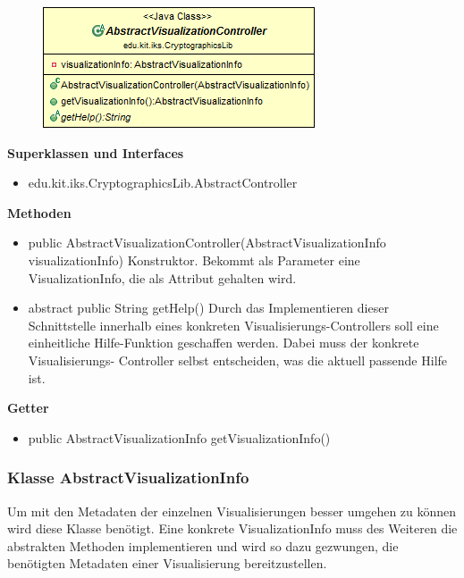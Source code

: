 \documentclass{article}
\begin{document}
      \begin{figure}[H]
        \centering
        \includegraphics{resources/edu-kit-iks-CryptographicsLib-AbstractVisualizationController}
      \end{figure}
	
      \textbf{Superklassen und Interfaces}
      \begin{itemize}
        \item edu.kit.iks.CryptographicsLib.AbstractController
      \end{itemize}
	
      \textbf{Methoden}
      \begin{itemize}
        \item public AbstractVisualizationController(AbstractVisualizationInfo visualizationInfo) \newline
          Konstruktor. Bekommt als Parameter eine VisualizationInfo, die als Attribut gehalten wird.
        \item abstract public String getHelp() \newline
          Durch das Implementieren dieser Schnittstelle innerhalb eines konkreten Visualisierungs-Controllers
          soll eine einheitliche Hilfe-Funktion geschaffen werden. Dabei muss der konkrete Visualisierungs-
          Controller selbst entscheiden, was die aktuell passende Hilfe ist.
      \end{itemize}
      
      \textbf{Getter}
      \begin{itemize}
		\item public AbstractVisualizationInfo getVisualizationInfo()
      \end{itemize}
	
	\subsubsection{Klasse AbstractVisualizationInfo}
	  Um mit den Metadaten der einzelnen Visualisierungen besser umgehen zu können
	  wird diese Klasse benötigt. Eine konkrete VisualizationInfo muss des Weiteren
	  die abstrakten Methoden implementieren und wird so dazu gezwungen, die 
	  benötigten Metadaten einer Visualisierung bereitzustellen.
	
\end{document}
